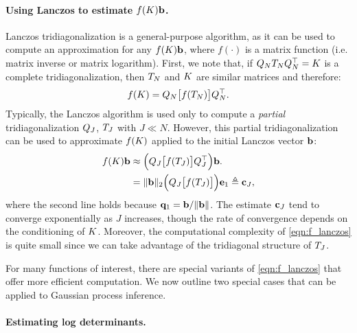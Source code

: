 \paragraph{Using Lanczos to estimate $f (K) \mathbf{b}$.}
Lanczos tridiagonalization is a general-purpose algorithm, as it can be used to compute an approximation for any $f(K) \mathbf{b}$, where $f( \cdot )$ is a matrix function (i.e. matrix inverse or matrix logarithm).
First, we note that, if $Q_N T_N Q_N^\top = K$ is a complete tridiagonalization, then $T_N$ and $K$ are similar matrices and therefore:
\begin{equation}
  f ( K ) = Q_N \bigl[ f ( T_N ) \bigr] Q_N^\top.
  \label{eqn:f_tridiagonal}
\end{equation}
%
%
Typically, the Lanczos algorithm is used only to compute a \emph{partial} tridiagonalization $Q_J$, $T_J$ with $J \ll N$.
However, this partial tridiagonalization can be used to approximate $f ( K )$ applied to the initial Lanczos vector $\mathbf{b}$:
%
\begin{align}
  f ( K ) \mathbf{b}
  &\approx \Bigl( Q_J \bigl[ f ( T_J ) \bigr] Q_J^\top \Bigr) \mathbf{b}.
  \nonumber \\
  &= \Vert \mathbf{b} \Vert_2 \Bigl( Q_J \bigl[ f ( T_J ) \bigr] \Bigr) \mathbf{e}_{1}
  \triangleq \mathbf{c}_J,
  \label{eqn:f_lanczos}
\end{align}
%
where the second line holds because $\mathbf{q}_1 = \mathbf{b} / \Vert \mathbf{b} \Vert$.
The estimate $\mathbf{c}_J$ tend to converge exponentially as $J$ increases, though the rate of convergence depends on the conditioning of $K$.
Moreover, the computational complexity of \cref{eqn:f_lanczos} is quite small since we can take advantage of the tridiagonal structure of $T_J$.

For many functions of interest, there are special variants of \cref{eqn:f_lanczos} that offer more efficient computation.
We now outline two special cases that can be applied to Gaussian process inference.

\paragraph{Estimating log determinants.}

